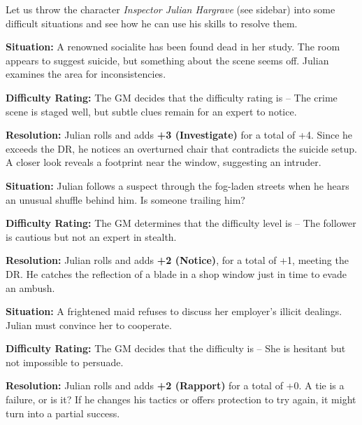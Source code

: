 Let us throw the character \emph{Inspector Julian Hargrave} (see sidebar) into some difficult situations and see how he can use his skills to resolve them.

\begin{WyrdExample}
	\textbf{Situation:} A renowned socialite has been found dead in her study. The room appears to suggest suicide, but something about the scene seems off. Julian examines the area for inconsistencies.

	\noindent
	\textbf{Difficulty Rating:} The GM decides that the difficulty rating is \Formidable – The crime scene is staged well, but subtle clues remain for an expert to notice.

	\noindent
	\textbf{Resolution:} Julian rolls  and adds \textbf{+3 (Investigate)} for a total of +4. Since he exceeds the DR, he notices an overturned chair that contradicts the suicide setup. A closer look reveals a footprint near the window, suggesting an intruder.
\end{WyrdExample}


\begin{WyrdExample}
	\textbf{Situation:} Julian follows a suspect through the fog-laden streets when he hears an unusual shuffle behind him. Is someone trailing him?

	\noindent\textbf{Difficulty Rating:} The GM determines that the difficulty level is \Difficult – The follower is cautious but not an expert in stealth.

	\noindent\textbf{Resolution:} Julian rolls  and adds  \textbf{+2 (Notice)}, for a total of +1, meeting the DR. He catches the reflection of a blade in a shop window just in time to evade an ambush.
\end{WyrdExample}


\begin{WyrdExample}
	\textbf{Situation:} A frightened maid refuses to discuss her employer’s illicit dealings. Julian must convince her to cooperate.

	\noindent\textbf{Difficulty Rating:} The GM decides that the difficulty is \Challenging – She is hesitant but not impossible to persuade.

	\noindent\textbf{Resolution:} Julian rolls \FudgeRes{+---} and adds \textbf{+2 (Rapport)} for a total of +0. A tie is a failure, or is it? If he changes his tactics or offers protection to try again, it might turn into a partial success.
\end{WyrdExample}


